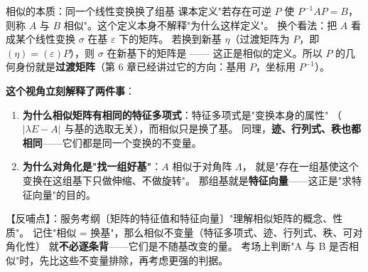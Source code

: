 
\begin{fdeep}{相似的本质：同一个线性变换换了组基}
课本定义"若存在可逆 $P$ 使 $P^{-1}AP=B$，则称 $A$ 与 $B$ 相似"。这个定义本身不解释"为什么这样定义"。
换个看法：把 $A$ 看成某个线性变换 $\sigma$ 在基 $\varepsilon$ 下的矩阵。
若换到新基 $\eta$（过渡矩阵为 $P$，即 $(\eta)=(\varepsilon)P$），则 $\sigma$ 在新基下的矩阵是
—— 这正是相似的定义。所以
$P$ 的几何身份就是\textbf{过渡矩阵}（第 6 章已经讲过它的方向：基用 $P$，坐标用 $P^{-1}$）。

\textbf{这个视角立刻解释了两件事}：
\begin{enumerate}[leftmargin=2.2em,itemsep=0.22em]
\item \textbf{为什么相似矩阵有相同的特征多项式}：特征多项式是"变换本身的属性"
      （$\lvert\lambda E-A\rvert$ 与基的选取无关），而相似只是换了基。
      同理，\textbf{迹、行列式、秩也都相同}——它们都是同一个变换的不变量。
\item \textbf{为什么对角化是"找一组好基"}：$A$ 相似于对角阵 $\Lambda$，
      就是"存在一组基使这个变换在这组基下只做伸缩、不做旋转"。
      那组基就是\textbf{特征向量}——这正是"求特征向量"的目的。
\end{enumerate}
【反哺点】：服务考纲〔矩阵的特征值和特征向量〕"理解相似矩阵的概念、性质"。
记住"相似 = 换基"，那么相似不变量（特征多项式、迹、行列式、秩、可对角化性）
就\textbf{不必逐条背}——它们是不随基改变的量。
考场上判断"A 与 B 是否相似"时，先比这些不变量排除，再考虑更强的判据。
\end{fdeep}

